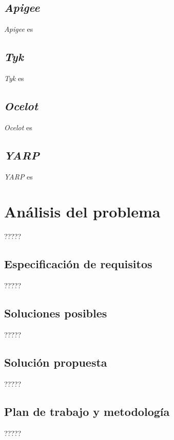 \documentclass[11pt,spanish,listoffigures]{tfgetsinf}
\begin{document}
\section{\emph{Apigee}}
\emph{Apigee} \cite{Apigee} es
	
\section{\emph{Tyk}}
\emph{Tyk} \cite{Tyk} es
	
\section{\emph{Ocelot}}
\emph{Ocelot} \cite{Ocelot} es
	
\section{\emph{YARP}}
\emph{YARP} \cite{YARP} es


\chapter{Análisis del problema}

?????

\section{Especificación de requisitos}

?????

\section{Soluciones posibles}

?????

\section{Solución propuesta}

?????

\section{Plan de trabajo y metodología}

?????

\end{document}
